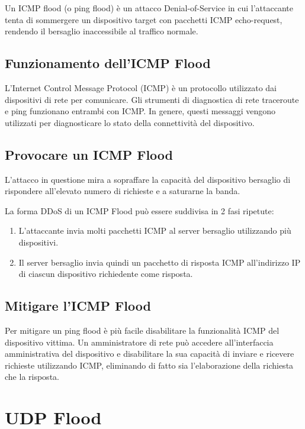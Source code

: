 Un ICMP flood (o ping flood) è un attacco Denial-of-Service in cui l'attaccante tenta di sommergere un dispositivo target con pacchetti ICMP echo-request, rendendo il bersaglio inaccessibile al traffico normale.

\subsection{Funzionamento dell'ICMP Flood}

L'Internet Control Message Protocol (ICMP) è un protocollo utilizzato dai dispositivi di rete per comunicare. Gli strumenti di diagnostica di rete traceroute e ping funzionano entrambi con ICMP. In genere, questi messaggi vengono utilizzati per diagnosticare lo stato della connettività del dispositivo.

\subsection{Provocare un ICMP Flood}

L'attacco in questione mira a sopraffare la capacità del dispositivo bersaglio di rispondere all'elevato numero di richieste e a saturarne la banda.

La forma DDoS di un ICMP Flood può essere suddivisa in 2 fasi ripetute:

\begin{enumerate}
    \item L'attaccante invia molti pacchetti ICMP al server bersaglio utilizzando più dispositivi.
    \item Il server bersaglio invia quindi un pacchetto di risposta ICMP all'indirizzo IP di ciascun dispositivo richiedente come risposta.
\end{enumerate}

\subsection{Mitigare l'ICMP Flood}

Per mitigare un ping flood è più facile disabilitare la funzionalità ICMP del dispositivo vittima. Un amministratore di rete può accedere all'interfaccia amministrativa del dispositivo e disabilitare la sua capacità di inviare e ricevere richieste utilizzando ICMP, eliminando di fatto sia l'elaborazione della richiesta che la risposta.

\section{UDP Flood}

